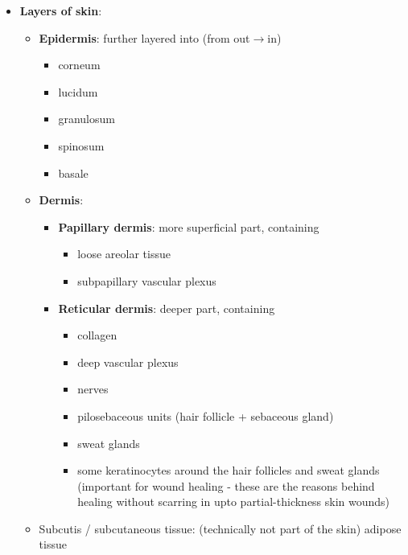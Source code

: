 \documentclass[
  12pt,
]{memoir}
\providecommand{\tightlist}{%
  \setlength{\itemsep}{0pt}\setlength{\parskip}{0pt}}
\begin{document}
\begin{itemize}
\tightlist
\item
  \textbf{Layers of skin}:

  \begin{itemize}
  \tightlist
  \item
    \textbf{Epidermis}: further layered into (from out\(\rightarrow\)in)

    \begin{itemize}
    \tightlist
    \item
      corneum
    \item
      lucidum
    \item
      granulosum
    \item
      spinosum
    \item
      basale
    \end{itemize}
  \item
    \textbf{Dermis}:

    \begin{itemize}
    \tightlist
    \item
      \textbf{Papillary dermis}: more superficial part, containing

      \begin{itemize}
      \tightlist
      \item
        loose areolar tissue
      \item
        subpapillary vascular plexus
      \end{itemize}
    \item
      \textbf{Reticular dermis}: deeper part, containing

      \begin{itemize}
      \tightlist
      \item
        collagen
      \item
        deep vascular plexus
      \item
        nerves
      \item
        pilosebaceous units (hair follicle + sebaceous gland)
      \item
        sweat glands
      \item
        some keratinocytes around the hair follicles and sweat glands
        (important for wound healing - these are the reasons behind
        healing without scarring in upto partial-thickness skin wounds)
      \end{itemize}
    \end{itemize}
  \item
    Subcutis / subcutaneous tissue: (technically not part of the skin)
    adipose tissue
  \end{itemize}
\end{itemize}
\end{document}
